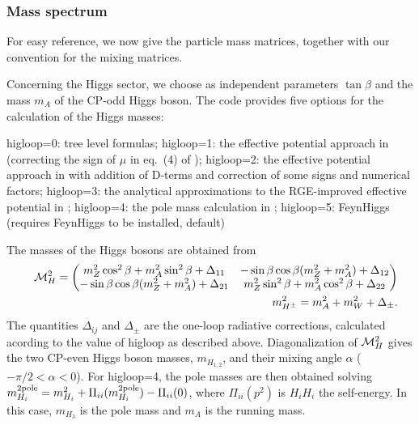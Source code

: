 \documentclass[a4paper,10pt,oneside]{book}
\newcommand{\ft}[1]{\textsf{#1}}
\begin{document}
\subsubsection{Mass spectrum}

For easy reference, we now give the particle mass matrices, together with our
convention for the mixing matrices.

Concerning the Higgs sector, we choose as independent parameters $\tan\beta$
and the mass $m_A$ of the CP-odd Higgs boson. The code provides five options
for the calculation of the Higgs masses: 


\ft{higloop}=0:  tree level formulas;
\ft{higloop}=1: the effective potential approach in
\cite{Ellis:1990nz,Ellis:1991zd,Brignole:1991pq} (correcting the sign of $\mu$ in eq.~(4) of
\cite{Brignole:1991pq}); 
\ft{higloop}=2: the effective potential approach in \cite{Drees:1991mx}
  with addition of D-terms and correction of some signs and numerical factors;
\ft{higloop}=3: the analytical approximations to the
  RGE-improved effective potential in \cite{Carena:1995bx};
\ft{higloop}=4: the pole mass calculation in \cite{Carena:1995wu};
\ft{higloop}=5: FeynHiggs (requires FeynHiggs to be
installed, default) \cite{Hahn:2010te}

The  masses of the Higgs bosons are obtained from
\begin{eqnarray}
&&  {\cal M}^2_{H} = 
  \left( %
      \begin{matrix} 
      {m_Z^2 \cos^2\beta + m_A^2 \sin^2\beta + \Delta_{11} } &
      {-\sin\beta\cos\beta(m_Z^2+m_A^2) + \Delta_{12} }
      \cr
      {-\sin\beta\cos\beta(m_Z^2+m_A^2) + \Delta_{21} } &
      {m_Z^2 \sin^2\beta + m_A^2 \cos^2\beta + \Delta_{22} }
      \end{matrix} %
      \right) 
  \\
&&  m^2_{H^{\pm}} = m_{A}^2+m_W^2 + \Delta_{\pm}.
\end{eqnarray}
The quantities $\Delta_{ij}$ and $\Delta_{\pm}$ are the one-loop
radiative corrections, calculated acording to the value of \ft{higloop} as
described above. Diagonalization of $ {\cal M}^2_{H} $ gives the two CP-even
Higgs boson masses, $ m_{H_{1,2}} $, and their mixing angle $\alpha$ ($ -\pi/2
< \alpha < 0$). For \ft{higloop}=4, the pole masses are then obtained solving
$ m^{2\rm pole}_{H_i} = m^2_{H_i} + \Pi_{ii}(m^{2\rm pole}_{H_i}) - \Pi_{ii}(0)
$, where $\Pi_{ii}(p^2)$ is $H_iH_i$ the self-energy. In this case, $m_{H_3}$
is the pole mass and $m_A$ is the running mass.
\end{document}
